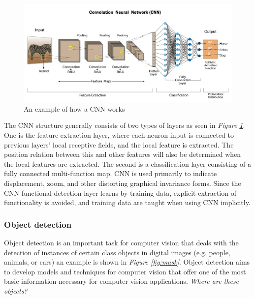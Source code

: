 \begin{figure}[h]
  \centering
  \includegraphics[width=1\textwidth]{graphics/methods/cnn.png}
  \caption{An example of how a CNN works\cite{swapna_convolutional_2020}}
  \label{fig:cnn}
\end{figure}

The CNN structure generally consists of two types of layers as seen in \textit{Figure \ref{fig:cnn}}. One is the feature extraction layer, where each neuron input is connected to previous layers' local receptive fields, and the local feature is extracted. 
The position relation between this and other features will also be determined when the local features are extracted. The second is a classification layer consisting of a fully connected multi-function map.
CNN is used primarily to indicate displacement, zoom, and other distorting graphical invariance forms. 
Since the CNN functional detection layer learns by training data, explicit extraction of functionality is avoided, and training data are taught when using CNN implicitly\cite{liu_implementation_2015}. %




\subsubsection*{Object detection}
Object detection is an important task for computer vision that deals with the detection of instances of certain class objects in digital images (e.g. people, animals, or cars) an example is shown in \textit{Figure \ref{fig:mask}}. Object detection aims to develop models and techniques for computer vision that offer one of the most basic information necessary for computer vision applications\cite{zou_object_2019}. \textit{Where are these objects?}

